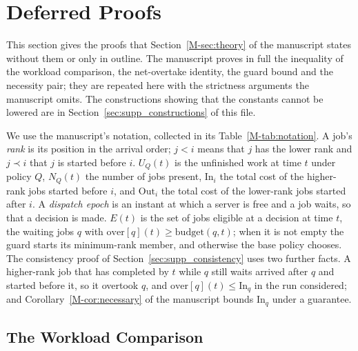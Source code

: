 \documentclass[mathematics,supfile,submit,moreauthors]{Definitions/mdpi}
\begin{document}
\section{Deferred Proofs}
\label{sec:supp_proofs}

This section gives the proofs that Section~\ref*{M-sec:theory} of the manuscript states
without them or only in outline. The manuscript proves in full the inequality of the
workload comparison, the net-overtake identity, the guard bound and the necessity pair;
they are repeated here with the strictness arguments the manuscript omits. The
constructions showing that the constants cannot be lowered are in
Section~\ref{sec:supp_constructions} of this file.

We use the manuscript's notation, collected in its Table~\ref*{M-tab:notation}. A job's
\emph{rank} is its position in the arrival order; $j < i$ means that $j$ has the lower rank
and $j \prec i$ that $j$ is started before $i$. $U_Q(t)$ is the unfinished work at time $t$
under policy $Q$, $N_Q(t)$ the number of jobs present, $\mathrm{In}_i$ the total cost of the
higher-rank jobs started before $i$, and $\mathrm{Out}_i$ the total cost of the lower-rank
jobs started after $i$. A \emph{dispatch epoch} is an instant at which a server is free and a job waits, so
that a decision is made. $E(t)$ is the set of jobs eligible at a decision at time $t$,
the waiting jobs $q$ with $\mathrm{over}[q](t) \ge \mathrm{budget}(q,t)$; when it is not
empty the guard starts its minimum-rank member, and otherwise the base policy chooses.
The consistency proof of Section~\ref{sec:supp_consistency} uses two
further facts. A higher-rank job that has completed by $t$ while $q$ still waits arrived
after $q$ and started before it, so it overtook $q$, and $\mathrm{over}[q](t) \le
\mathrm{In}_q$ in the run considered; and Corollary~\ref*{M-cor:necessary} of the
manuscript bounds $\mathrm{In}_q$ under a guarantee.

\subsection{The Workload Comparison}
\label{sec:supp_gap}
\end{document}
